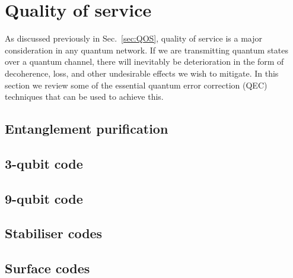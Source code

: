 %
%

\section{Quality of service}


As discussed previously in Sec.~\ref{sec:QOS}, quality of service is a major consideration in any quantum network. If we are transmitting quantum states over a quantum channel, there will inevitably be deterioration in the form of decoherence, loss, and other undesirable effects we wish to mitigate. In this section we review some of the essential quantum error correction (QEC) techniques that can be used to achieve this.

%
%

\subsection{Entanglement purification}


%
%

\subsection{3-qubit code}


%
%

\subsection{9-qubit code}


%
%

\subsection{Stabiliser codes}


%
%

\subsection{Surface codes}

